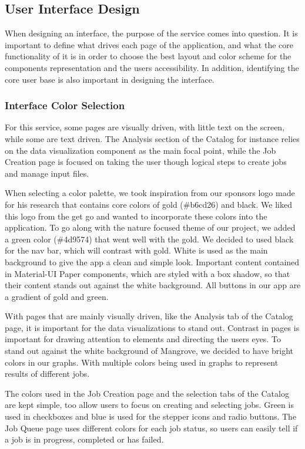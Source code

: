 \subsection{User Interface Design}
When designing an interface, the purpose of the service comes into question. It is important to define what drives each page of the application, and what the core functionality of it is in order to choose the best layout and color scheme for the component\textquotesingle s representation and the user\textquotesingle s accessibility. In addition, identifying the core user base is also important in designing the interface.

\subsubsection{Interface Color Selection}
For this service, some pages are visually driven, with little text on the screen, while some are text driven. The Analysis section of the Catalog for instance relies on the data visualization component as the main focal point, while the Job Creation page is focused on taking the user though logical steps to create jobs and manage input files.\par
When selecting a color palette, we took inspiration from our sponsor\textquotesingle s logo made for his research that contains core colors of gold (\#b6cd26) and black. We liked this logo from the get go and wanted to incorporate these colors into the application. To go along with the nature focused theme of our project, we added a green color (\#4d9574) that went well with the gold. We decided to used black for the nav bar, which will contrast with gold. White is used as the main background to give the app a clean and simple look. Important content contained in Material-UI Paper components, which are styled with a box shadow, so that their content stands out against the white background. All buttons in our app are a gradient of gold and green.\par
With pages that are mainly visually driven, like the Analysis tab of the Catalog page, it is important for the data visualizations to stand out. Contrast in pages is important for drawing attention to elements and directing the user\textquotesingle s eyes. To stand out against the white background of Mangrove, we decided to have bright colors in our graphs. With multiple colors being used in graphs to represent results of different jobs.\par
The colors used in the Job Creation page and the selection tabs of the Catalog are kept simple, too allow users to focus on creating and selecting jobs. Green is used in checkboxes and blue is used for the stepper icons and radio buttons. The Job Queue page uses different colors for each job status, so users can easily tell if a job is in progress, completed or has failed.\par

